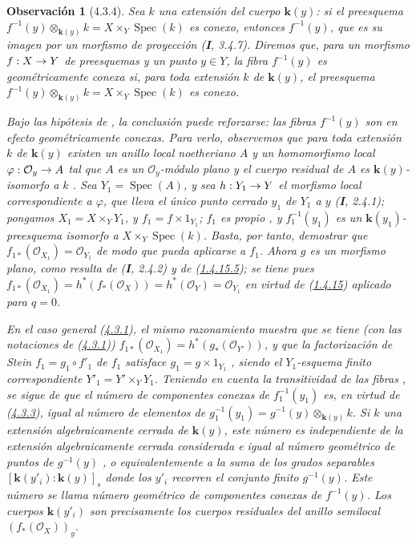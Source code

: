 \documentclass[10pt,oneside,openany]{book}
\theoremstyle{egaenv}\newtheorem*{env}{---}
\theoremstyle{egastatement}
\theoremstyle{egadescription}
\newtheorem*{remark}{Observación}
\newcommand{\oldpage}[2][]{\marginnote{\normalfont\scriptsize\textbf{#1}\,|\,#2}\ignorespaces}
\renewcommand{\to}{\mathchoice{\longrightarrow}{\rightarrow}{\rightarrow}{\rightarrow}}
\begin{document}
\begin{remark}[4.3.4]
\label{III.4.3.4}
\label{III.4.3.4-fr}
Sea $k$ una extensión del cuerpo $\boldsymbol{k}(y)$: si el preesquema $f^{-1}(y)\otimes_{\boldsymbol{k}(y)}k=X\times_Y\operatorname{Spec}(k)$
es conexo, entonces $f^{-1}(y)$, que es su imagen por un morfismo de proyección (\textbf{I}, 3.4.7). Diremos que, para un morfismo $f:X\to Y$ de preesquemas y un punto
$y\in Y$, la fibra $f^{-1}(y)$ es
\emph{geométricamente conexa} si, para \emph{toda} extensión $k$ de
$\boldsymbol{k}(y)$, el preesquema
$f^{-1}(y)\otimes_{\boldsymbol{k}(y)}k=X\times_Y\operatorname{Spec}(k)$ es conexo.

\oldpage[III]{132}

Bajo las hipótesis de , la conclusión puede
reforzarse: las fibras $f^{-1}(y)$ son en efecto \emph{geométricamente conexas}. Para verlo, observemos que para toda extensión $k$ de $\boldsymbol{k}(y)$ existen un anillo
local noetheriano $A$ y un homomorfismo local
$\varphi:\mathcal O_y\to A$
tal que $A$ es un $\mathcal O_y$-módulo plano y el cuerpo residual de
$A$ es $\boldsymbol{k}(y)$-isomorfo a $k$ .
Sea $Y_1=\operatorname{Spec}(A)$, y sea $h:Y_1\to Y$ el morfismo local
correspondiente a $\varphi$, que lleva el único punto cerrado $y_1$ de
$Y_1$ a $y$ (\textbf{I}, 2.4.1); pongamos
$X_1=X\times_YY_1$, y $f_1=f\times1_{Y_1}$; $f_1$ es propio
, y $f_1^{-1}(y_1)$ es un
$\boldsymbol{k}(y_1)$-preesquema isomorfo a $X\times_Y\operatorname{Spec}(k)$. Basta, por
tanto, demostrar que
$f_{1*}(\mathcal O_{X_1})=\mathcal O_{Y_1}$
de modo que  pueda aplicarse a $f_1$. Ahora $g$ es un morfismo \emph{plano},
como resulta de (\textbf{I}, 2.4.2) y de
(\hyperref[III.1.4.15-fr]{1.4.15.5}); se tiene pues
$f_{1*}(\mathcal O_{X_1})
=h^*(f_*(\mathcal O_X))
=h^*(\mathcal O_Y)
=\mathcal O_{Y_1}$
en virtud de (\hyperref[III.1.4.15-fr]{1.4.15}) aplicado para $q=0$.

En el caso general (\hyperref[III.4.3.1-fr]{4.3.1}), el mismo razonamiento
muestra que se tiene (con las notaciones de
(\hyperref[III.4.3.1-fr]{4.3.1}))
$f_{1*}(\mathcal O_{X_1})=h^*(g_*(\mathcal O_{Y'}))$,
y que la factorización de Stein $f_1=g_1\circ f'_1$ de $f_1$
satisface
$g_1=g\times1_{Y_1}$
, siendo el $Y_1$-esquema finito correspondiente
$Y'_1=Y'\times_YY_1$. Teniendo en cuenta la transitividad de las
fibras , se sigue de
 que el número de componentes conexas de
$f_1^{-1}(y_1)$ es, en virtud de (\hyperref[III.4.3.3-fr]{4.3.3}), igual al número de elementos de $g_1^{-1}(y_1)=g^{-1}(y)\otimes_{\boldsymbol{k}(y)}k$.
Si $k$ una extensión \emph{algebraicamente cerrada} de $\boldsymbol{k}(y)$, este número
es independiente de la extensión algebraicamente cerrada considerada e igual al
\emph{número geométrico de puntos de} $g^{-1}(y)$
, o equivalentemente a la \emph{suma de los grados separables}
$[\boldsymbol{k}(y'_i):\boldsymbol{k}(y)]_s$
donde los $y'_i$ recorren el conjunto finito $g^{-1}(y)$. Este número
se llama \emph{número geométrico de componentes conexas} de
$f^{-1}(y)$. Los cuerpos $\boldsymbol{k}(y'_i)$ son precisamente los cuerpos
residuales del anillo semilocal $(f_*(\mathcal O_X))_y$.
\end{remark}
\end{document}

